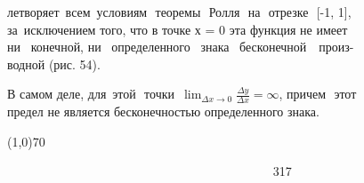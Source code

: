 \documentclass[14pt]{extarticle}
\begin{document}
летворяет\, всем\, условиям\,\, теоремы\,\, Ролля\,\, на\,\, отрезке\,\, [-1, 1],\\
за\, исключением того, что в точке х = 0 эта функция не имеет\\
ни\,\,\, конечной, ни\,\,\, определенного\,\,\, знака\,\,\, бесконечной\,\,\,\, произ-\\
водной (рис. 54).
\par
В самом деле, для\, этой\,\, точки\, $\displaystyle{\lim_{\Delta x \to 0}} \frac{\Delta y}{\Delta x} = \infty$, причем\,\, этот\\
предел не является бесконечностью определенного знака.\\
\begin{center}
	\hspace{-83pt} \line(1,0){70}
\end{center}
~~~~~~~~~~~~~~~~~~~~~~~~~~~~~~~~~~~~~~~~~~ 317
\thispagestyle{empty}
\end{document}
